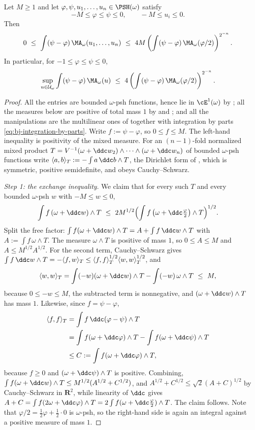\begin{lemma}
\label{lem:ch48-fundamental}
Let $M\ge1$ and let $\varphi,\psi,u_1,\dots,u_n\in\PSH(\omega)$ satisfy
\[
 -M\le\varphi\le\psi\le0,\qquad -M\le u_i\le0 .
\]
Then
\[
 0\ \le\ \int(\psi-\varphi)\,\MA_\omega(u_1,\dots,u_n)
 \ \le\ 4M\left(\int(\psi-\varphi)\,\MA_\omega(\varphi/2)\right)^{2^{-n}} .
\]
In particular, for $-1\le\varphi\le\psi\le0$,
\[
 \sup_{u\in\mathcal U_\omega}\int(\psi-\varphi)\,\MA_\omega(u)
 \ \le\ 4\left(\int(\psi-\varphi)\,\MA_\omega(\varphi/2)\right)^{2^{-n}} .
\]
\end{lemma}

\begin{proof}
All the entries are bounded $\omega$-psh functions, hence lie in
$\cE^1(\omega)$ by ; all the measures below are
positive of total mass $1$ by  and
; and all the manipulations are the
multilinear ones of  together with integration by
parts \eqref{eq:bj-integration-by-parts}.  Write $f:=\psi-\varphi$, so
$0\le f\le M$.  The left-hand inequality is positivity of the mixed
measure.  For an $(n-1)$-fold normalized mixed product
$T=V^{-1}(\omega+\ddc w_2)\wedge\cdots\wedge(\omega+\ddc w_n)$ of bounded
$\omega$-psh functions write
$\langle a,b\rangle_T:=-\int a\,\ddc b\wedge T$, the Dirichlet form of
, which is symmetric, positive semidefinite,
and obeys Cauchy--Schwarz.

\emph{Step 1: the exchange inequality.}  We claim that for every such
$T$ and every bounded $\omega$-psh $w$ with $-M\le w\le0$,
\[
 \int f\,(\omega+\ddc w)\wedge T
 \ \le\ 2M^{1/2}
   \Bigl(\int f\,\bigl(\omega+\ddc\tfrac\varphi2\bigr)\wedge T\Bigr)^{1/2}.
\]
Split the free factor:
$\int f(\omega+\ddc w)\wedge T=A+\int f\,\ddc w\wedge T$ with
$A:=\int f\,\omega\wedge T$.  The measure $\omega\wedge T$ is positive
of mass $1$, so $0\le A\le M$ and $A\le M^{1/2}A^{1/2}$.  For the
second term, Cauchy--Schwarz gives
$\int f\,\ddc w\wedge T=-\langle f,w\rangle_T
\le\langle f,f\rangle_T^{1/2}\langle w,w\rangle_T^{1/2}$, and
\[
 \langle w,w\rangle_T=\int(-w)(\omega+\ddc w)\wedge T
   -\int(-w)\,\omega\wedge T\ \le\ M,
\]
because $0\le-w\le M$, the subtracted term is nonnegative, and
$(\omega+\ddc w)\wedge T$ has mass $1$.  Likewise, since
$f=\psi-\varphi$,
\[
 \begin{aligned}
 \langle f,f\rangle_T
 &=\int f\,\ddc(\varphi-\psi)\wedge T\\
 &=\int f(\omega+\ddc\varphi)\wedge T
   -\int f(\omega+\ddc\psi)\wedge T\\
 &\le C:=\int f(\omega+\ddc\varphi)\wedge T ,
 \end{aligned}
\]
because $f\ge0$ and $(\omega+\ddc\psi)\wedge T$ is positive.
Combining, $\int f(\omega+\ddc w)\wedge T\le M^{1/2}(A^{1/2}+C^{1/2})$,
and $A^{1/2}+C^{1/2}\le\sqrt2(A+C)^{1/2}$ by Cauchy--Schwarz in
$\mathbf R^2$, while linearity of $\ddc$ gives
$A+C=\int f(2\omega+\ddc\varphi)\wedge T
=2\int f(\omega+\ddc\tfrac\varphi2)\wedge T$.  The claim follows.  Note
that $\varphi/2=\tfrac12\varphi+\tfrac12\cdot0$ is $\omega$-psh, so the
right-hand side is again an integral against a positive measure of mass
$1$.


\end{proof}
